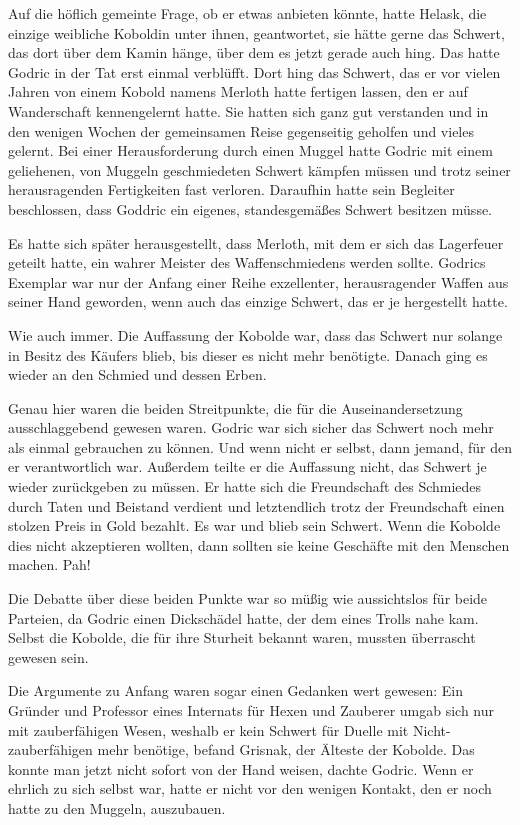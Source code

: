 \documentclass[fontsize=12pt]{scrartcl}
\begin{document}
	Auf die höflich gemeinte Frage, ob er etwas anbieten könnte, hatte Helask, die einzige weibliche Koboldin unter ihnen, geantwortet, sie hätte gerne das Schwert, das dort über dem Kamin hänge, über dem es jetzt gerade auch hing. Das hatte Godric in der Tat erst einmal verblüfft. Dort hing das Schwert, das er vor vielen Jahren von einem Kobold namens Merloth hatte fertigen lassen, den er auf Wanderschaft kennengelernt hatte. Sie hatten sich ganz gut verstanden und in den wenigen Wochen der gemeinsamen Reise gegenseitig geholfen und vieles gelernt. Bei einer Herausforderung durch einen Muggel hatte Godric mit einem geliehenen, von Muggeln geschmiedeten Schwert kämpfen müssen und trotz seiner herausragenden Fertigkeiten fast verloren. Daraufhin hatte sein Begleiter beschlossen, dass Goddric ein eigenes, standesgemäßes Schwert besitzen müsse. 
	
	Es hatte sich später herausgestellt, dass Merloth, mit dem er sich das Lagerfeuer geteilt hatte, ein wahrer Meister des Waffenschmiedens werden sollte. Godrics Exemplar war nur der Anfang einer Reihe exzellenter, herausragender Waffen aus seiner Hand geworden, wenn auch das einzige Schwert, das er je hergestellt hatte. 
	
	Wie auch immer. Die Auffassung der Kobolde war, dass das Schwert nur solange in Besitz des Käufers blieb, bis dieser es nicht mehr benötigte. Danach ging es wieder an den Schmied und dessen Erben. 
	
	Genau hier waren die beiden Streitpunkte, die für die Auseinandersetzung ausschlaggebend gewesen waren. Godric war sich sicher das Schwert noch mehr als einmal gebrauchen zu können. Und wenn nicht er selbst, dann jemand, für den er verantwortlich war. Außerdem teilte er die Auffassung nicht, das Schwert je wieder zurückgeben zu müssen. Er hatte sich die Freundschaft des Schmiedes durch Taten und Beistand verdient und letztendlich trotz der Freundschaft einen stolzen Preis in Gold bezahlt. Es war und blieb sein Schwert. Wenn die Kobolde dies nicht akzeptieren wollten, dann sollten sie keine Geschäfte mit den Menschen machen. Pah!
	
	Die Debatte über diese beiden Punkte war so müßig wie aussichtslos für beide Parteien, da Godric einen Dickschädel hatte, der dem eines Trolls nahe kam. Selbst die Kobolde, die für ihre Sturheit bekannt waren, mussten überrascht gewesen sein. 
	
	Die Argumente zu Anfang waren sogar einen Gedanken wert gewesen: Ein Gründer und Professor eines Internats für Hexen und Zauberer umgab sich nur mit zauberfähigen Wesen, weshalb er kein Schwert für Duelle mit Nicht-zauberfähigen mehr benötige, befand Grisnak, der Älteste der Kobolde.  Das konnte man jetzt nicht sofort von der Hand weisen, dachte Godric. Wenn er ehrlich zu sich selbst war, hatte er nicht vor den wenigen Kontakt, den er noch hatte zu den Muggeln, auszubauen. 
	
\end{document}
